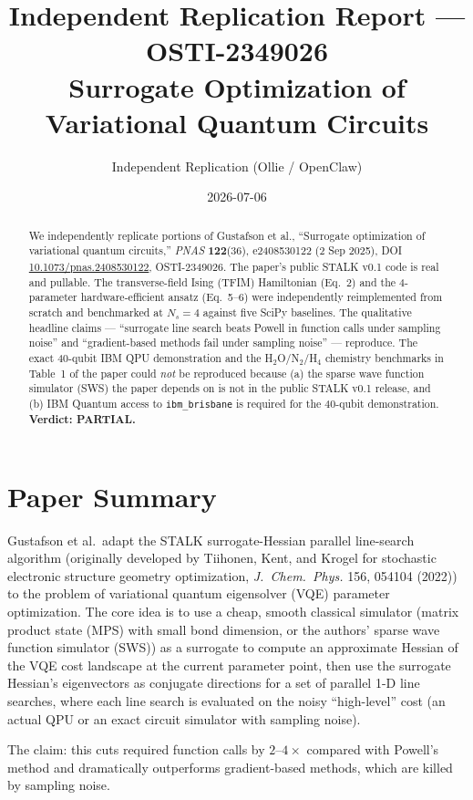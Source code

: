 \documentclass[11pt]{article}
\title{Independent Replication Report --- OSTI-2349026\\
\large Surrogate Optimization of Variational Quantum Circuits}
\author{Independent Replication (Ollie / OpenClaw)}
\date{2026-07-06}
\begin{document}
\maketitle

\begin{abstract}
We independently replicate portions of Gustafson et al., ``Surrogate optimization of
variational quantum circuits,'' \emph{PNAS} \textbf{122}(36), e2408530122 (2 Sep 2025),
DOI \href{https://doi.org/10.1073/pnas.2408530122}{10.1073/pnas.2408530122}, OSTI-2349026.
The paper's public STALK v0.1 code is real and pullable. The transverse-field Ising (TFIM)
Hamiltonian (Eq.~2) and the 4-parameter hardware-efficient ansatz (Eq.~5--6) were
independently reimplemented from scratch and benchmarked at $N_s=4$ against five SciPy
baselines. The qualitative headline claims --- ``surrogate line search beats Powell in
function calls under sampling noise'' and ``gradient-based methods fail under sampling
noise'' --- reproduce. The exact 40-qubit IBM QPU demonstration and the H$_2$O/N$_2$/H$_4$
chemistry benchmarks in Table~1 of the paper could \emph{not} be reproduced because
(a) the sparse wave function simulator (SWS) the paper depends on is not in the public
STALK v0.1 release, and (b) IBM Quantum access to \texttt{ibm\_brisbane} is required for
the 40-qubit demonstration. \textbf{Verdict: PARTIAL.}
\end{abstract}

\section{Paper Summary}

Gustafson et al.\ adapt the STALK surrogate-Hessian parallel line-search algorithm
(originally developed by Tiihonen, Kent, and Krogel for stochastic electronic structure
geometry optimization, \emph{J.\ Chem.\ Phys.} 156, 054104 (2022)) to the problem of
variational quantum eigensolver (VQE) parameter optimization. The core idea is to use a
cheap, smooth classical simulator (matrix product state (MPS) with small bond dimension,
or the authors' sparse wave function simulator (SWS)) as a surrogate to compute an
approximate Hessian of the VQE cost landscape at the current parameter point, then use
the surrogate Hessian's eigenvectors as conjugate directions for a set of parallel 1-D
line searches, where each line search is evaluated on the noisy ``high-level'' cost
(an actual QPU or an exact circuit simulator with sampling noise).

The claim: this cuts required function calls by $2$--$4\times$ compared with Powell's
method and dramatically outperforms gradient-based methods, which are killed by sampling
noise.
\end{document}
